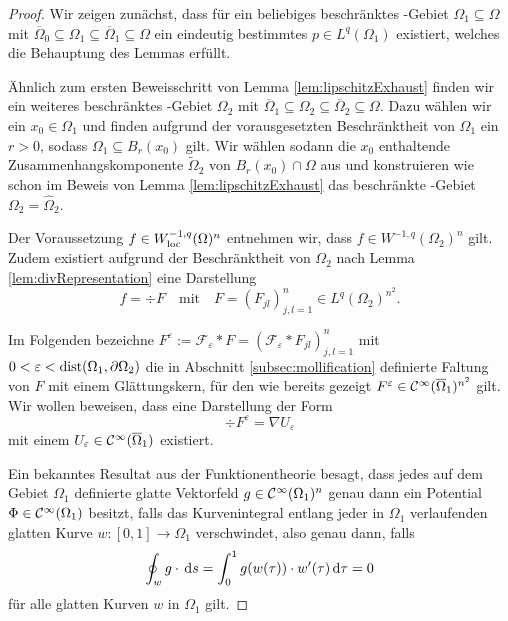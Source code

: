 \begin{proof}
  Wir zeigen zunächst, dass für ein beliebiges beschränktes \lipschitz\hyp{}Gebiet $\Omega_1 \subseteq \Omega$ mit $\overline\Omega_0 \subseteq \Omega_1 \subseteq \overline\Omega_1 \subseteq \Omega$ ein eindeutig bestimmtes $p \in L^q(\Omega_1)$ existiert, welches die Behauptung des Lemmas erfüllt.

  Ähnlich zum ersten Beweisschritt von Lemma \ref{lem:lipschitzExhaust} finden wir ein weiteres beschränktes \lipschitz\hyp{}Gebiet $\Omega_2$ mit $\overline\Omega_1 \subseteq \Omega_2 \subseteq \overline\Omega_2 \subseteq \Omega$.
  Dazu wählen wir ein $x_0 \in \Omega_1$ und finden aufgrund der vorausgesetzten Beschränktheit von $\Omega_1$ ein $r > 0$, sodass $\Omega_1 \subseteq B_r(x_0)$ gilt.
  Wir wählen sodann die $x_0$ enthaltende Zusammenhangskomponente $\widetilde\Omega_2$ von $B_r(x_0) \cap \Omega$ aus und konstruieren wie schon im Beweis von Lemma \ref{lem:lipschitzExhaust} das beschränkte \lipschitz\hyp{}Gebiet $\Omega_2 = \widehat\Omega_2$.

  Der Voraussetzung $f \in W_{\operatorname{loc}}^{-1,q}(\Omega)^n$ entnehmen wir, dass $f \in W^{-1,q}(\Omega_2)^n$ gilt. Zudem existiert aufgrund der Beschränktheit von $\Omega_2$ nach Lemma \ref{lem:divRepresentation} eine Darstellung
  $$
  f = \div F \quad\text{mit}\quad F = (F_{jl})_{j,l=1}^n \in L^q(\Omega_2)^{n^2}.
  $$

  Im Folgenden bezeichne $F^\varepsilon := \mathcal{F}_\varepsilon \ast F = (\mathcal{F}_\varepsilon \ast F_{jl})_{j,l=1}^n$ mit $0 < \varepsilon < \operatorname{dist}(\Omega_1, \partial\Omega_2)$ die in Abschnitt \ref{subsec:mollification} definierte Faltung von $F$ mit einem Glättungskern, für den wie bereits gezeigt $F^\varepsilon \in \mathcal{C}^\infty(\overline\Omega_1)^{n^2}$ gilt.
  Wir wollen beweisen, dass eine Darstellung der Form
  $$
  \div F^\varepsilon = \nabla U_\varepsilon
  $$
  mit einem $U_\varepsilon \in \mathcal{C}^\infty(\overline\Omega_1)$ existiert.

  Ein bekanntes Resultat aus der Funktionentheorie besagt, dass jedes auf dem Gebiet $\Omega_1$ definierte glatte Vektorfeld $g \in \mathcal{C}^\infty(\Omega_1)^n$ genau dann ein Potential $\Phi \in \mathcal{C}^\infty(\Omega_1)$ besitzt, falls das Kurvenintegral entlang jeder in $\Omega_1$ verlaufenden glatten Kurve $w \colon [0,1] \to \Omega_1$ verschwindet, also genau dann, falls
  $$
  \oint_w g \cdot \, {\operatorname{d}\!{s}} = \int_0^1 g(w(\tau))\cdot w'(\tau) \, {\operatorname{d}\!{\tau}} = 0
  $$
  für alle glatten Kurven $w$ in $\Omega_1$ gilt.


\end{proof}
